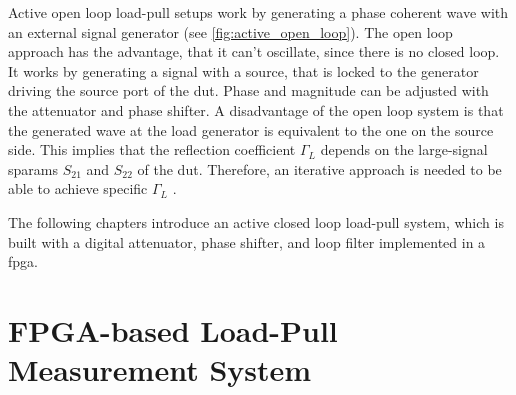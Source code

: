 \documentclass[12pt,a4paper,parskip=full,abstract=true,BCOR=10mm,twoside,open=right]{scrreprt}
\begin{document}
Active open loop load-pull setups work by generating a phase coherent wave with
an external signal generator (see \cref{fig:active_open_loop}). The open loop
approach has the advantage, that it can't oscillate, since there is no closed loop.
It works by generating a signal with a source, that is locked to the generator driving the
source port of the \gls{dut}. Phase and magnitude can be adjusted with the attenuator and
phase shifter. A disadvantage of the open loop system is that the generated wave at
the load generator is equivalent to the one on the source side. This implies that the reflection coefficient
$\Gamma_L$ depends on the large-signal \glspl{sparam} $S_{21}$ and $S_{22}$ of the \gls{dut}.
Therefore, an iterative approach is needed to be able to achieve specific $\Gamma_L$ \cite{muller_comparison_1994}.

The following chapters introduce an active closed loop load-pull system, which
is built with a digital attenuator, phase shifter, and loop filter implemented
in a \gls{fpga}.


\chapter{FPGA-based Load-Pull Measurement System}
\end{document}
